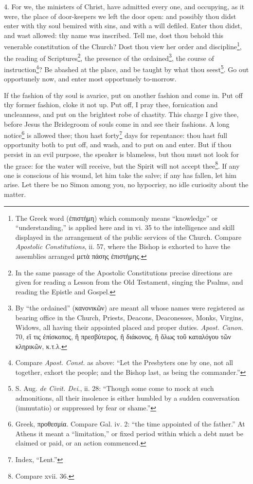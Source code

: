 4. For we, the ministers of Christ, have admitted every one, and occupying, as it were, the place of door-keepers we left the door open: and possibly thou didst enter with thy soul bemired with sins, and with a will defiled. Enter thou didst, and wast allowed: thy name was inscribed. Tell me, dost thou behold this venerable constitution of the Church? Dost thou view her order and discipline\footnote{The Greek word (\textgreek{ἐπιστήμη}) which commonly means “knowledge” or “understanding,” is applied here and in vi. 35 to the intelligence and skill displayed in the arrangement of the public services of the Church. Compare \emph{Apostolic Constitutions}, ii. 57, where the Bishop is exhorted to have the assemblies arranged \textgreek{μετὰ πάσης ἐπιστήμης}.}, the reading of Scriptures\footnote{In the same passage of the Apostolic Constitutions precise directions are given for reading a Lesson from the Old Testament, singing the Psalms, and reading the Epistle and Gospel.}, the presence of the ordained\footnote{By “the ordained” (\textgreek{κανονικῶν}) are meant all whose names were registered as bearing office in the Church, Priests, Deacons, Deaconesses, Monks, Virgins, Widows, all having their appointed placed and proper duties. \emph{Apost. Canon}. 70, \textgreek{εἴ τις ἐπίσκοπος, ἢ πρεσβύτερος, ἢ διάκονος, ἢ ὅλως τοῦ καταλόγου τῶν κληρικῶν, κ.τ.λ}.}, the course of instruction\footnote{Compare \emph{Apost. Const.} as above: “Let the Presbyters one by one, not all together, exhort the people; and the Bishop last, as being the commander.”}? Be abashed at the place, and be taught by what thou seest\footnote{S. Aug. \emph{de Civit. Dei}., ii. 28: “Though some come to mock at such admonitions, all their insolence is either humbled by a sudden conversation (immutatio) or suppressed by fear or shame.”}. Go out opportunely now, and enter most opportunely to-morrow.

If the fashion of thy soul is avarice, put on another fashion and come in. Put off thy former fashion, cloke it not up. Put off, I pray thee, fornication and uncleanness, and put on the brightest robe of chastity. This charge I give thee, before Jesus the Bridegroom of souls come in and see their fashions. A long notice\footnote{Greek, \textgreek{προθεσμία}. Compare Gal. iv. 2: “the time appointed of the father.” At Athens it meant a “limitation,” or fixed period within which a debt must be claimed or paid, or an action commenced.} is allowed thee; thou hast forty\footnote{Index, “Lent.”} days for repentance: thou hast full opportunity both to put off, and wash, and to put on and enter. But if thou persist in an evil purpose, the speaker is blameless, but thou must not look for the grace: for the water will receive, but the Spirit will not accept thee\footnote{Compare xvii. 36.}. If any one is conscious of his wound, let him take the salve; if any has fallen, let him arise. Let there be no Simon among you, no hypocrisy, no idle curiosity about the matter.


